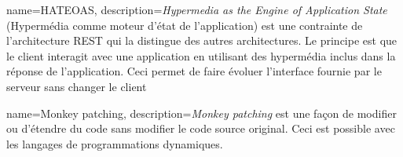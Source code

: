\documentclass[a4paper,12pt,dvipsnames]{report}
\begin{document}
 { 
    name={HATEOAS}, 
    description={\textit{Hypermedia as the Engine of Application State} 
        (Hypermédia comme moteur d'état de l'application) est une contrainte 
        de l'architecture REST qui la distingue des autres architectures. 
        Le principe est que le client interagit avec une application en 
        utilisant des hypermédia inclus dans la réponse de l'application. 
        Ceci permet de faire évoluer l'interface fournie par le serveur sans 
        changer le client}
    }

 { 
    name={Monkey patching},
    description={\textit{Monkey patching} est une façon de modifier ou 
        d'étendre du code sans modifier le code source original. Ceci est 
        possible avec les langages de programmations dynamiques.}
    }


\printglossaries


{} 
\printbibliography 
\end{document}
